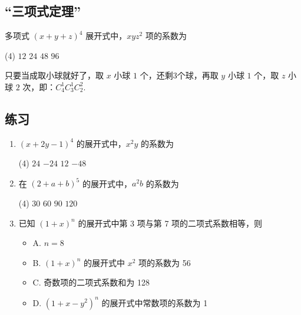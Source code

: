 \subsection{“三项式定理”}

\begin{example}
    多项式 $(x+y+z)^{4}$ 展开式中，$x y z^{2}$ 项的系数为
    \begin{tasks}(4)
        \task $12$
        \task $24$
        \task $48$
        \task $96$
    \end{tasks}
\end{example}

\begin{solution}
    只要当成取小球就好了，取 $x$ 小球 $1$ 个，还剩3个球，再取 $y$ 小球 $1$ 个，取 $z$ 小球 $2$ 次，即：$C_4^1 C_3^1 C_2^2.$
\end{solution}

\subsection*{练习}

\begin{enumerate}

    \item $(x+2 y-1)^{4}$ 的展开式中，$x^{2} y$ 的系数为
          \begin{tasks}(4)
              \task $24$
              \task $-24$
              \task $12$
              \task $-48$
          \end{tasks}

    \item 在 $(2+a+b)^{5}$ 的展开式中，$a^{2} b$ 的系数为
          \begin{tasks}(4)
              \task $30$
              \task $60$
              \task $90$
              \task $120$
          \end{tasks}

    \item 已知 $(1+x)^{n}$ 的展开式中第 3 项与第 7 项的二项式系数相等，则
          \begin{itemize}
              \item A. $n=8$
              \item B. $(1+x)^{n}$ 的展开式中 $x^{2}$ 项的系数为 56
              \item C. 奇数项的二项式系数和为 128
              \item D. $\left(1+x-y^{2}\right)^{n}$ 的展开式中常数项的系数为 1
          \end{itemize}
\end{enumerate}

